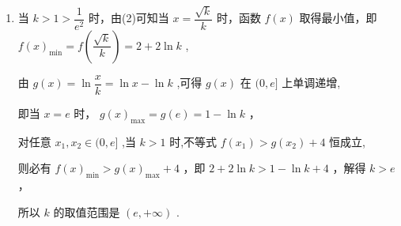 \begin{enumerate}
\begin{enumerate}
\begin{jieda}
\begin{enumerate}
                综上,当 $0 < k \leq  \dfrac{1}{{{e}}^{2}}$ 时, $f\left( x\right)$ 的单调递减区间为 $(0,{e}\rbrack$
                
                当 $k > \dfrac{1}{{{e}}^{2}}$ 时, $f\left( x\right)$ 的单调递减区间为 $\left( {0,\dfrac{\sqrt{k}}{k}}\right)$ ,单调递增区间为 $\left( {\dfrac{\sqrt{k}}{k},{e}}\right)$ .
                
                \item 当 $k > 1 > \dfrac{1}{{{e}}^{2}}$ 时，由(2)可知当 $x = \dfrac{\sqrt{k}}{k}$ 时，函数 $f\left( x\right)$ 取得最小值，即 $f{\left( x\right) }_{\min } = f\left( \dfrac{\sqrt{k}}{k}\right)  = 2 + 2\ln k$ ,
                
                由 $g\left( x\right)  = \ln \dfrac{x}{k} = \ln x - \ln k$ ,可得 $g\left( x\right)$ 在 $(0,{e}\rbrack$ 上单调递增,
                
                即当 $x = {e}$ 时， $g{\left( x\right) }_{\max } = g\left( {e}\right)  = 1 - \ln k$ ，
                
                对任意 ${x}_{1},{x}_{2} \in  (0,{e}\rbrack$ ,当 $k > 1$ 时,不等式 $f\left( {x}_{1}\right)  > g\left( {x}_{2}\right)  + 4$ 恒成立,
                
                则必有 $f{\left( x\right) }_{\min } > g{\left( x\right) }_{\max } + 4$ ，即 $2 + 2\ln k > 1 - \ln k + 4$ ，解得 $k > {e}$ ，
                
                所以 $k$ 的取值范围是 $\left( {{e}, + \infty }\right)$ .
            \end{enumerate}
        \end{jieda}
        

\end{enumerate}
\end{enumerate}
